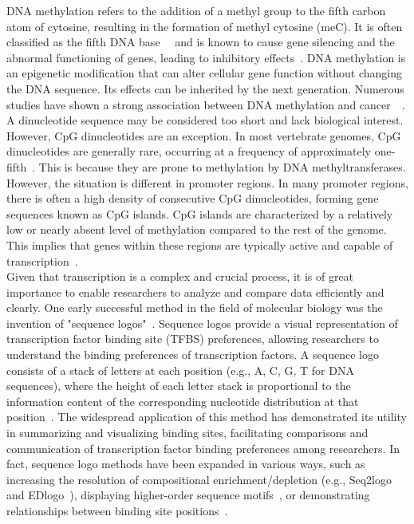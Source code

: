 \documentclass{PHlab-thesis}
\begin{document}
DNA methylation refers to the addition of a methyl group to the fifth carbon atom of cytosine, resulting in the formation of methyl cytosine (meC). It is often classified as the fifth DNA base~\cite{Listerfifthbase2009}~\cite{Vinermethylsensitive2016} and is known to cause gene silencing and the abnormal functioning of genes, leading to inhibitory effects~\cite{Jones2012DNAmethylationislands}. DNA methylation is an epigenetic modification that can alter cellular gene function without changing the DNA sequence. Its effects can be inherited by the next generation. Numerous studies have shown a strong association between DNA methylation and cancer~\cite{KeithDNAmethyl2005}~\cite{Feinberg1983Hypomethylation}.\\
\indent A dinucleotide sequence may be considered too short and lack biological interest. However, CpG dinucleotides are an exception. In most vertebrate genomes, CpG dinucleotides are generally rare, occurring at a frequency of approximately one-fifth~\cite{Saxonov2006}. This is because they are prone to methylation by DNA methyltransferases. However, the situation is different in promoter regions. In many promoter regions, there is often a high density of consecutive CpG dinucleotides, forming gene sequences known as CpG islands. CpG islands are characterized by a relatively low or nearly absent level of methylation compared to the rest of the genome. This implies that genes within these regions are typically active and capable of transcription~\cite{Deaton2011CpG}.\\
\indent Given that transcription is a complex and crucial process, it is of great importance to enable researchers to analyze and compare data efficiently and clearly. One early successful method in the field of molecular biology was the invention of "sequence logos"~\cite{schneider1990sequence}. Sequence logos provide a visual representation of transcription factor binding site (TFBS) preferences, allowing researchers to understand the binding preferences of transcription factors. A sequence logo consists of a stack of letters at each position (e.g., {A, C, G, T} for DNA sequences), where the height of each letter stack is proportional to the information content of the corresponding nucleotide distribution at that position~\cite{schneider1990sequence}. The widespread application of this method has demonstrated its utility in summarizing and visualizing binding sites, facilitating comparisons and communication of transcription factor binding preferences among researchers. In fact, sequence logo methods have been expanded in various ways, such as increasing the resolution of compositional enrichment/depletion (e.g., Seq2logo~\cite{Seq2Logo10.1093/nar/gks469} and EDlogo~\cite{Dey2018sequencelogo}), displaying higher-order sequence motifs~\cite{10.1093/nar/gky497}, or demonstrating relationships between binding site positions~\cite{Siebert2016Bayesian}.\\
\end{document}
